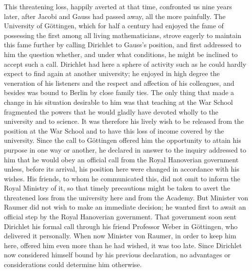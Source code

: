 \documentclass[11pt]{article}
\begin{document}
This threatening loss, happily averted at that time, confronted us nine years later, after Jacobi and Gauss had passed away, all the more painfully. The University of Göttingen, which for half a century had enjoyed the fame of possessing the first among all living mathematicians, strove eagerly to maintain this fame further by calling Dirichlet to Gauss's position, and first addressed to him the question whether, and under what conditions, he might be inclined to accept such a call. Dirichlet had here a sphere of activity such as he could hardly expect to find again at another university; he enjoyed in high degree the veneration of his listeners and the respect and affection of his colleagues, and besides was bound to Berlin by close family ties. The only thing that made a change in his situation desirable to him was that teaching at the War School fragmented the powers that he would gladly have devoted wholly to the university and to science. It was therefore his lively wish to be released from the position at the War School and to have this loss of income covered by the university. Since the call to Göttingen offered him the opportunity to attain his purpose in one way or another, he declared in answer to the inquiry addressed to him that he would obey an official call from the Royal Hanoverian government unless, before its arrival, his position here were changed in accordance with his wishes. His friends, to whom he communicated this, did not omit to inform the Royal Ministry of it, so that timely precautions might be taken to avert the threatened loss from the university here and from the Academy. But Minister von Raumer did not wish to make an immediate decision; he wanted first to await an official step by the Royal Hanoverian government. That government soon sent Dirichlet his formal call through his friend Professor Weber in Göttingen, who delivered it personally. When now Minister von Raumer, in order to keep him here, offered him even more than he had wished, it was too late. Since Dirichlet now considered himself bound by his previous declaration, no advantages or considerations could determine him otherwise.
\end{document}
